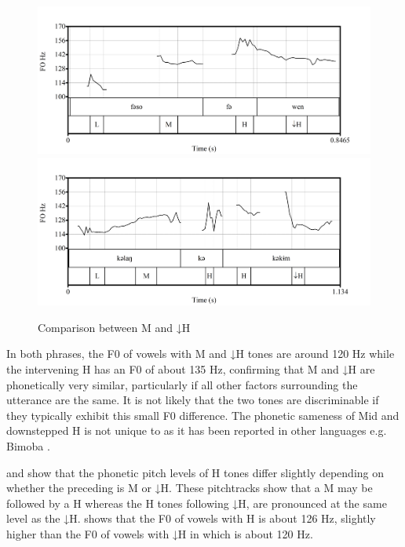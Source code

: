 \documentclass[output=paper,modfonts,nonflat,
colorlinks, citecolor=brown,
draftmode,
draft
]{langsci/langscibook}
\begin{document}
\begin{figure}[htbp]
	{\includegraphics[width=\textwidth]{figures/fig-akumbu-2a}}\\
	{\includegraphics[width=\textwidth]{figures/fig-akumbu-2b}}
\caption{Comparison between M and ↓H}\label{fig:akumbu:2}
\end{figure}

\newpage 
In both phrases, the F0 of vowels with M and ↓H tones are around 120 Hz while the intervening H  has an F0 of about 135 Hz, confirming that M and ↓H are phonetically very similar, particularly if all other factors surrounding the utterance are the same. It is not likely that the two tones are discriminable if they typically exhibit this small F0 difference. The phonetic sameness of Mid and downstepped H is not unique to  as it has been reported in other languages e.g. Bimoba \citep{Snider1998}. 
	
 and  show that the phonetic pitch levels of H tones differ slightly depending on whether the preceding  is M or ↓H. These pitchtracks show that a M  may be followed by a H  whereas the H tones following ↓H, are pronounced at the same level as the ↓H.  shows that the F0 of vowels with H  is about 126 Hz, slightly higher than the F0 of vowels with ↓H in  which is about 120 Hz. 
\end{document}
